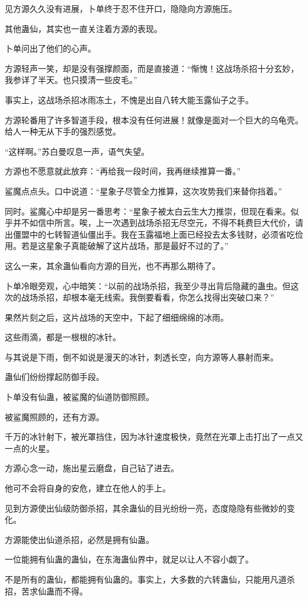 \begin{this_body}
见方源久久没有进展，卜单终于忍不住开口，隐隐向方源施压。

其他蛊仙，其实也一直关注着方源的表现。

卜单问出了他们的心声。

方源轻声一笑，却是没有强撑颜面，而是直接道：“惭愧！这战场杀招十分玄妙，我参详了半天。也只摸清一些皮毛。”

事实上，这战场杀招冰雨冻土，不愧是出自八转大能玉露仙子之手。

方源轮番用了许多智道手段，根本没有任何进展！就像是面对一个巨大的乌龟壳。给人一种无从下手的强烈感觉。

“这样啊。”苏白曼叹息一声，语气失望。

方源也不愿意就此放弃：“再给我一段时间，我再继续推算一番。”

鲨魔点点头。口中说道：“星象子尽管全力推算，这次攻势我们来替你挡着。”

同时。鲨魔心中却是另一番思考：“星象子被太白云生大力推崇，但现在看来。似乎并不如信中所言。唉，上一次遇到战场杀招无尽空元，不得不耗费巨大代价，请出僵盟中的七转智道仙僵出手。我在玉露福地上面已经投去太多钱财，必须省吃俭用。若是这星象子真能破解了这片战场，那是最好不过的了。”

这么一来，其余蛊仙看向方源的目光，也不再那么期待了。

卜单冷眼旁观，心中暗笑：“以前的战场杀招，我至少寻出背后隐藏的蛊虫。但这次的战场杀招，却根本毫无线索。我倒要看看，你怎么找得出突破口来？”

果然片刻之后，这片战场的天空中，下起了细细绵绵的冰雨。

这些雨滴，都是一根根的冰针。

与其说是下雨，倒不如说是漫天的冰针，刺透长空，向方源等人暴射而来。

蛊仙们纷纷撑起防御手段。

卜单没有仙蛊，被鲨魔的仙道防御照顾。

被鲨魔照顾的，还有方源。

千万的冰针射下，被光罩挡住，因为冰针速度极快，竟然在光罩上击打出了一点又一点的火星。

方源心念一动，施出星云磨盘，自己钻了进去。

他可不会将自身的安危，建立在他人的手上。

见到方源使出仙级防御杀招，其余蛊仙的目光纷纷一亮，态度隐隐有些微妙的变化。

方源能使出仙道杀招，必然是拥有仙蛊。

一位能拥有仙蛊的蛊仙，在东海蛊仙界中，就足以让人不容小觑了。

不是所有的蛊仙，都能拥有仙蛊的。事实上，大多数的六转蛊仙，只能用凡道杀招，苦求仙蛊而不得。


\end{this_body}
